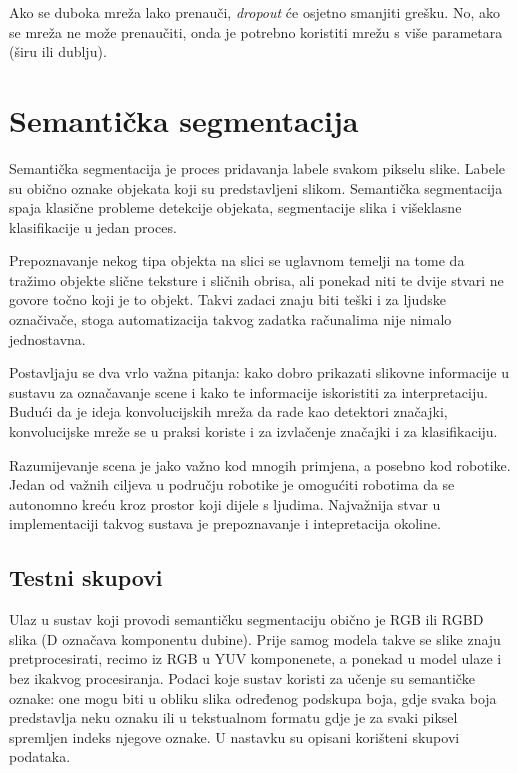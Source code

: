 \documentclass[times, utf8, diplomski, numeric]{fer}
\begin{document}
Ako se duboka mreža lako prenauči, \emph{dropout} će osjetno smanjiti grešku. No, ako se mreža ne može prenaučiti, onda je potrebno koristiti mrežu s više parametara (širu ili dublju).


\chapter{Semantička segmentacija}

Semantička segmentacija je proces pridavanja labele svakom pikselu slike. Labele su obično oznake objekata koji su predstavljeni slikom.
Semantička segmentacija spaja klasične probleme detekcije objekata, segmentacije slika i višeklasne klasifikacije u jedan proces.

Prepoznavanje nekog tipa objekta na slici se uglavnom temelji na tome da tražimo objekte slične teksture i sličnih obrisa, ali ponekad niti te dvije stvari ne govore točno koji je to objekt. Takvi zadaci znaju biti teški i za ljudske označivače, stoga automatizacija takvog zadatka računalima nije nimalo jednostavna.

Postavljaju se dva vrlo važna pitanja: kako dobro prikazati slikovne informacije u sustavu za označavanje scene i kako te informacije iskoristiti za interpretaciju. Budući da je ideja konvolucijskih mreža da rade kao detektori značajki, konvolucijske mreže se u praksi koriste i za izvlačenje značajki i za klasifikaciju.

Razumijevanje scena je jako važno kod mnogih primjena, a posebno kod robotike. Jedan od važnih ciljeva u području robotike je omogućiti robotima da se autonomno kreću kroz prostor koji dijele s ljudima. Najvažnija stvar u implementaciji takvog sustava je prepoznavanje i intepretacija okoline.


\section{Testni skupovi}

Ulaz u sustav koji provodi semantičku segmentaciju obično je RGB ili RGBD slika (D označava komponentu dubine). Prije samog modela takve se slike znaju pretprocesirati, recimo iz RGB u YUV komponenete, a ponekad u model ulaze i bez ikakvog procesiranja. Podaci koje sustav koristi za učenje su semantičke oznake: one mogu biti u obliku slika određenog podskupa boja, gdje svaka boja predstavlja neku oznaku ili u tekstualnom formatu gdje je za svaki piksel spremljen indeks njegove oznake. U nastavku su opisani korišteni skupovi podataka.
\end{document}

